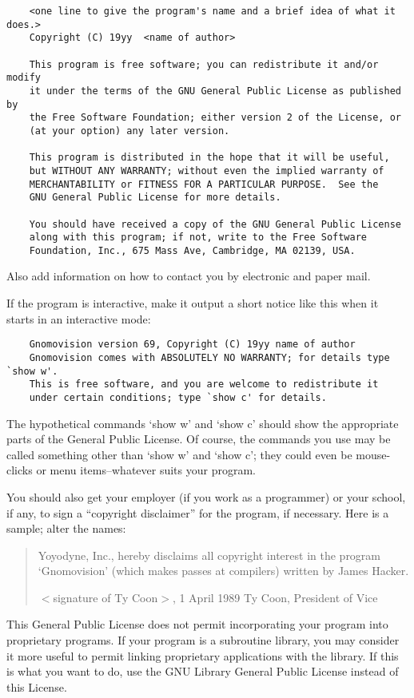 \begin{verbatim}
    <one line to give the program's name and a brief idea of what it does.>
    Copyright (C) 19yy  <name of author>

    This program is free software; you can redistribute it and/or modify
    it under the terms of the GNU General Public License as published by
    the Free Software Foundation; either version 2 of the License, or
    (at your option) any later version.

    This program is distributed in the hope that it will be useful,
    but WITHOUT ANY WARRANTY; without even the implied warranty of
    MERCHANTABILITY or FITNESS FOR A PARTICULAR PURPOSE.  See the
    GNU General Public License for more details.

    You should have received a copy of the GNU General Public License
    along with this program; if not, write to the Free Software
    Foundation, Inc., 675 Mass Ave, Cambridge, MA 02139, USA.
\end{verbatim}

Also add information on how to contact you by electronic and paper mail.

If the program is interactive, make it output a short notice like this
when it starts in an interactive mode:

\begin{verbatim}
    Gnomovision version 69, Copyright (C) 19yy name of author
    Gnomovision comes with ABSOLUTELY NO WARRANTY; for details type `show w'.
    This is free software, and you are welcome to redistribute it
    under certain conditions; type `show c' for details.
\end{verbatim}

The hypothetical commands `show w' and `show c' should show the appropriate
parts of the General Public License.  Of course, the commands you use may
be called something other than `show w' and `show c'; they could even be
mouse-clicks or menu items--whatever suits your program.

You should also get your employer (if you work as a programmer) or your
school, if any, to sign a ``copyright disclaimer'' for the program, if
necessary.  Here is a sample; alter the names:

\begin{quote}
  Yoyodyne, Inc., hereby disclaims all copyright interest in the program
  `Gnomovision' (which makes passes at compilers) written by James Hacker.

  $<$signature of Ty Coon$>$, 1 April 1989
  Ty Coon, President of Vice
\end{quote}

This General Public License does not permit incorporating your program into
proprietary programs.  If your program is a subroutine library, you may
consider it more useful to permit linking proprietary applications with the
library.  If this is what you want to do, use the GNU Library General
Public License instead of this License.


\printindex




